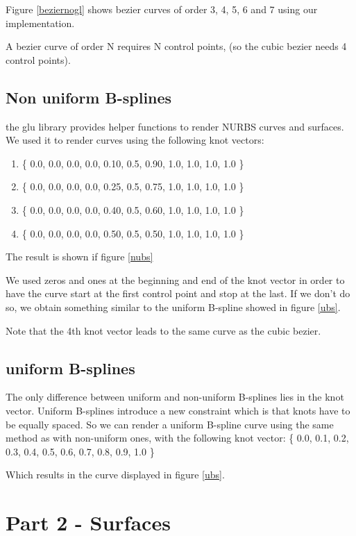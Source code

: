 Figure \ref{beziernogl} shows bezier curves of order 3, 4, 5, 6 and 7 using our implementation.

A bezier curve of order N requires N control points, (so the cubic bezier needs 4 control points). 


\subsection{Non uniform B-splines}

the glu library provides helper functions to render NURBS curves and surfaces. We
used it to render curves using the following knot vectors:
\begin{enumerate}
    \item \{ 0.0, 0.0, 0.0, 0.0, 0.10, 0.5, 0.90, 1.0, 1.0, 1.0, 1.0 \} 
    \item \{ 0.0, 0.0, 0.0, 0.0, 0.25, 0.5, 0.75, 1.0, 1.0, 1.0, 1.0 \} 
    \item \{ 0.0, 0.0, 0.0, 0.0, 0.40, 0.5, 0.60, 1.0, 1.0, 1.0, 1.0 \}
    \item \{ 0.0, 0.0, 0.0, 0.0, 0.50, 0.5, 0.50, 1.0, 1.0, 1.0, 1.0 \}
\end{enumerate}
The result is shown if figure \ref{nubs}


We used zeros and ones at the beginning and end of the knot vector in order to have
the curve start at the first control point and stop at the last. If we don't do so,
we obtain something similar to the uniform B-spline showed in figure \ref{ubs}.

Note that the 4th knot vector leads to the same curve as the cubic bezier.

\subsection{uniform B-splines}
The only difference between uniform and non-uniform B-splines lies in the knot vector.
Uniform B-splines introduce a new constraint which is that knots have to be equally
spaced. So we can render a uniform B-spline curve using the same method as with
non-uniform ones, with the following knot vector:
\{ 0.0, 0.1, 0.2, 0.3, 0.4, 0.5, 0.6, 0.7, 0.8, 0.9, 1.0 \}

Which results in the curve displayed in figure \ref{ubs}.


\section{Part 2 - Surfaces}

